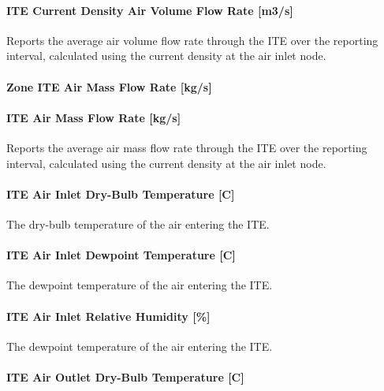 \paragraph{ITE Current Density Air Volume Flow Rate {[}m3/s{]}}\label{ite-current-density-air-volume-flow-rate-m3s}

Reports the average air volume flow rate through the ITE over the reporting interval, calculated using the current density at the air inlet node.

\paragraph{Zone ITE Air Mass Flow Rate {[}kg/s{]}}\label{zone-ite-air-mass-flow-rate-kgs}

\paragraph{ITE Air Mass Flow Rate {[}kg/s{]}}\label{ite-air-mass-flow-rate-kgs}

Reports the average air mass flow rate through the ITE over the reporting interval, calculated using the current density at the air inlet node.

\paragraph{ITE Air Inlet Dry-Bulb Temperature {[}C{]}}\label{ite-air-inlet-dry-bulb-temperature-c}

The dry-bulb temperature of the air entering the ITE.

\paragraph{ITE Air Inlet Dewpoint Temperature {[}C{]}}\label{ite-air-inlet-dewpoint-temperature-c}

The dewpoint temperature of the air entering the ITE.

\paragraph{ITE Air Inlet Relative Humidity {[}\%{]}}\label{ite-air-inlet-relative-humidity}

The dewpoint temperature of the air entering the ITE.

\paragraph{ITE Air Outlet Dry-Bulb Temperature {[}C{]}}\label{ite-air-outlet-dry-bulb-temperature-c}

